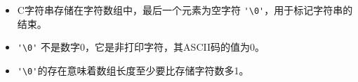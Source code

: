 


\begin{frame}[fragile]\ft{\secname}
  \begin{free}[C字符串]{}
    \begin{itemize}
    \item C字符串存储在字符数组中，最后一个元素为空字符 \lstinline|'\0'|，用于标记字符串的结束。\\[0.15in]
    \item  \lstinline|'\0'| 不是数字0，它是非打印字符，其ASCII码的值为0。\\[0.15in]
    \item \lstinline|'\0'|的存在意味着数组长度至少要比存储字符数多1。
    \end{itemize}    
  \end{free}

\end{frame}


